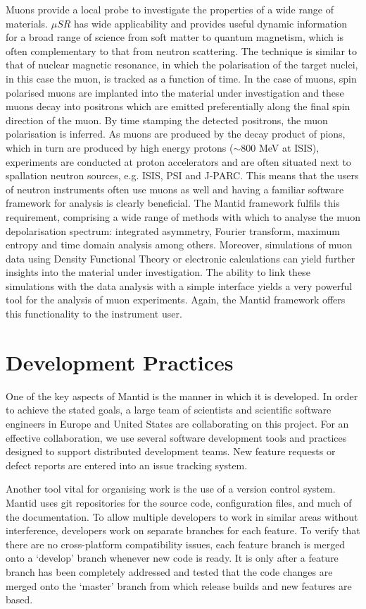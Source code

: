 \documentclass[1p]{elsarticle}
\begin{document}
Muons provide a local probe to investigate the properties of a wide range of materials. 
$\mu SR$ has wide applicability and provides useful dynamic information for a broad range of science  from soft matter to quantum magnetism,  which is often complementary  to that from neutron scattering. 
The technique is similar to that of nuclear magnetic resonance, in which the polarisation of the target nuclei, in this case the muon, is tracked as a function of time. 
In the case of muons, spin polarised muons are implanted into the material under investigation and these muons decay into  positrons which are emitted preferentially along the final spin direction of the muon. 
By time stamping the detected positrons, the muon polarisation is inferred. As muons are produced by the decay product of pions, which in turn are produced by high energy protons ($\sim$800 MeV at ISIS), experiments are conducted at proton accelerators and are often situated next to spallation neutron sources, e.g. ISIS, PSI and J-PARC. 
This means that the users of neutron instruments often use muons as well and having a familiar software framework for analysis is clearly beneficial.
The Mantid framework fulfils this requirement, comprising  a wide range of methods with which to analyse the muon depolarisation spectrum:  integrated asymmetry, Fourier transform, maximum entropy and time domain analysis among others. 
Moreover, simulations of muon data using Density Functional Theory or electronic calculations can yield further insights into the material under investigation. 
The ability to link these simulations with the data analysis with a simple interface yields a very powerful tool for the analysis of muon experiments. Again, the Mantid framework offers this functionality to the instrument user.



\section{Development Practices}
One of the key  aspects of Mantid is the manner in which it is developed. 
In order to achieve the stated goals, a large team of scientists and scientific software engineers in Europe and United States are collaborating on this project. For an effective collaboration, we use several software development tools and practices designed to support distributed development teams. New feature requests or defect reports are entered into an issue tracking system. 

Another tool vital for organising work is the use of a version control system. Mantid uses git \cite{git} repositories for the source code, configuration files, and much of the documentation. To allow multiple developers to work in similar areas without interference, developers work on separate branches for each feature. To verify that there are no cross-platform compatibility issues, each feature branch is merged onto a `develop' branch whenever new code is ready. It is only after a feature branch has been completely addressed and tested that the code changes are merged onto the `master' branch from which release builds and new features are based.
\end{document}
